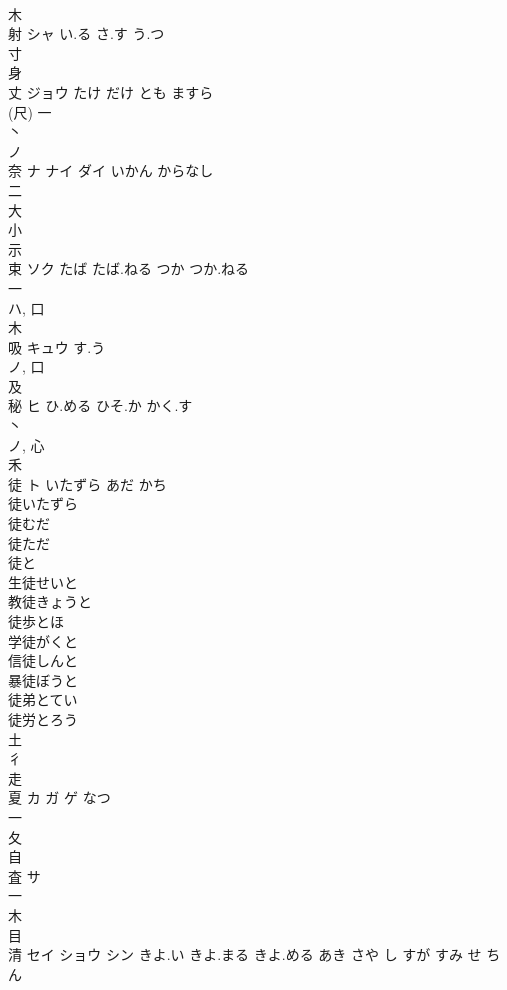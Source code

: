 \documentclass[8pt]{extreport}
\begin{document}
\begin{CJK}{UTF8}{min}
\\	木 
\\	射	シャ	い.る さ.す う.つ	
\\	寸 
\\	身 
\\	丈	ジョウ	たけ だけ とも ますら	
\\	(尺)				一 
\\	丶 
\\	ノ	
\\	奈	ナ ナイ ダイ	いかん からなし	
\\	二 
\\	大 
\\	小 
\\	示 
\\	束	ソク	たば たば.ねる つか つか.ねる	
\\	一 
\\	ハ, 口 
\\	木 
\\	吸	キュウ	す.う	
\\	ノ, 口 
\\	及 
\\	秘	ヒ	ひ.める ひそ.か かく.す	
\\	丶 
\\	ノ, 心 
\\	禾 
\\	徒	ト	いたずら あだ かち	
\\	徒いたずら 
\\	徒むだ 
\\	徒ただ 
\\	徒と 
\\	生徒せいと 
\\	教徒きょうと 
\\	徒歩とほ 
\\	学徒がくと 
\\	信徒しんと 
\\	暴徒ぼうと 
\\	徒弟とてい 
\\	徒労とろう 
\\	土 
\\	彳 
\\	走 
\\	夏	カ ガ ゲ	なつ	
\\	一 
\\	夂 
\\	自 
\\	査	サ		
\\	一 
\\	木 
\\	目 
\\	清	セイ ショウ シン	きよ.い きよ.まる きよ.める あき さや し すが すみ せ ちん	

\end{CJK}
\end{document}
